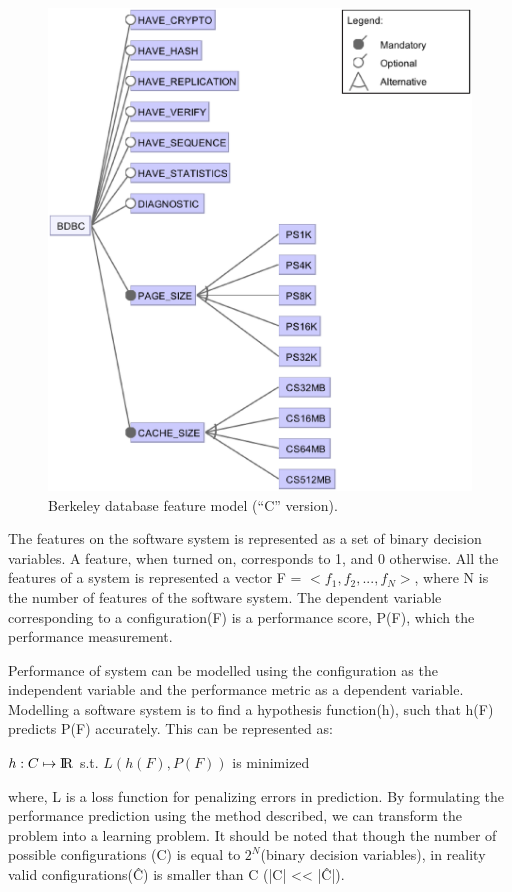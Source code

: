 \documentclass{sig-alternative}
\begin{document}
\begin{figure}[!t]
\includegraphics[width=0.9\linewidth]{Figures/BDBC.eps}
\caption{ Berkeley database feature model   (``C'' version). }\label{fig:bdbc}
\end{figure}
    
    The features on the software system is represented as a set of binary decision variables. A feature, when turned on, corresponds to 1, and 0 otherwise. All the features of a system is represented a vector F = $<f_1, f_2, ...,f_N>$, where N is the number of features of the software system. The dependent variable corresponding to a configuration(F) is a performance score, P(F), which the performance measurement.

    Performance of system can be modelled using the configuration as the independent variable and the performance metric as a dependent variable. 
    Modelling a software system is to find a hypothesis function(h), such that h(F) predicts P(F) accurately. This can be represented as:\\
\begin{center}
    $ h: C \mapsto \rm I\!R$ s.t. $L(h(F), P(F))$ is minimized\\
\end{center}

where, L is a loss function for penalizing errors in prediction. By formulating the performance prediction using the method described, we can transform the problem into a learning problem. 
    It should be noted that though the number of possible configurations (C) is equal to $2^N$(binary decision variables), in reality valid configurations(\^{C}) is smaller than C (|C| << |\^C|). 
\end{document}
